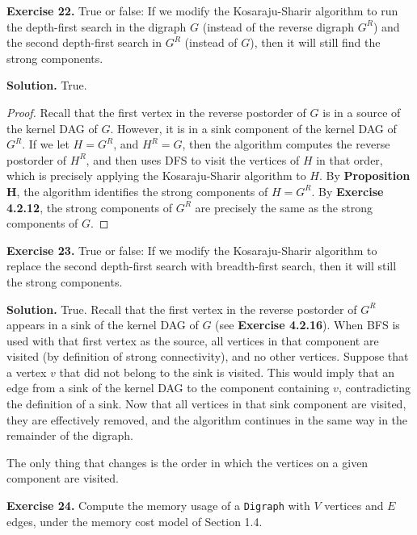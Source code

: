 \documentclass[12pt, a4paper]{article}
\newenvironment{ex}[2][Exercise]
{\par\medskip\noindent \textbf{#1 #2.}}
{\medskip}
\newenvironment{sol}[1][Solution]
{\par\medskip\noindent \textbf{#1.} }
{\medskip}
\begin{document}
	\begin{ex}{22}
		True or false: If we modify the Kosaraju-Sharir algorithm to run the depth-first
		search in the digraph $G$ (instead of the reverse digraph $G^R$) and the second
		depth-first search in $G^R$ (instead of $G$), then it will still find the strong
		components.
	\end{ex}
	\begin{sol}
		True.
		\begin{proof}
			Recall that the first vertex in the reverse postorder of $G$ is in a source
			of the kernel DAG of $G$. However, it is in a sink component of the kernel DAG
			of $G^R$. If we let $H=G^R$, and $H^R=G$, then the algorithm computes
			the reverse postorder of $H^R$, and then uses DFS to visit the vertices
			of $H$ in that order, which is precisely applying the Kosaraju-Sharir
			algorithm to $H$. By \textbf{Proposition H}, the algorithm identifies the
			strong components of $H=G^R$. By \textbf{Exercise 4.2.12}, the strong
			components of $G^R$ are precisely the same as the strong components of $G$.
		\end{proof}
	\end{sol}
	\begin{ex}{23}
		True or false: If we modify the Kosaraju-Sharir algorithm to replace the second
		depth-first search with breadth-first search, then it will still the strong
		components.
	\end{ex}
	\begin{sol}
		True. Recall that the first vertex in the reverse postorder of $G^R$ appears
		in a sink of the kernel DAG of $G$ (see \textbf{Exercise 4.2.16}). When
		BFS is used with that first vertex as the source, all vertices in that
		component are visited (by definition of strong connectivity), and no
		other vertices. Suppose that a vertex $v$ that did not belong to the
		sink is visited. This would imply that an edge from a sink of the
		kernel DAG to the component containing $v$, contradicting the definition
		of a sink. Now that all vertices in that sink component are visited,
		they are effectively removed, and the algorithm continues in the
		same way in the remainder of the digraph.
		
		The only thing that changes is the order in which the vertices on a given
		component are visited.
	\end{sol}
	\begin{ex}{24}
		Compute the memory usage of a \texttt{Digraph} with $V$ vertices and $E$ edges,
		under the memory cost model of Section 1.4.
	\end{ex}
\end{document}
